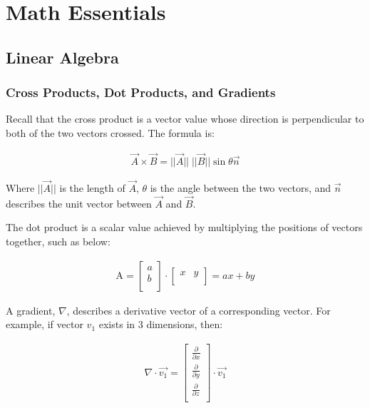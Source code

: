 \chapter{Math Essentials}

\section{Linear Algebra}

\label{sec:linalg}

\subsection{Cross Products, Dot Products, and Gradients}

Recall that the cross product is a vector value whose direction is perpendicular to both of the two vectors crossed. The formula is:

\begin{equation} \label{crossproductformula}
\begin{split}
\vec{A} \times \vec{B} = ||\vec{A}|| \; ||\vec{B}|| \sin\theta \vec{n}
\end{split}
\end{equation}

Where $||\vec{A}||$ is the length of $\vec{A}$, $\theta$ is the angle between the two vectors, and $\vec{n}$ describes the unit vector between $\vec{A}$ and $\vec{B}$.\newline

The dot product is a scalar value achieved by multiplying the positions of vectors together, such as below: 

\begin{align}
\mathrm{A} =
\begin{bmatrix} %
 a  \\ 
 b  \\ 
\end{bmatrix}
\cdot
\begin{bmatrix} %
x  &  y    \\ 
\end{bmatrix}
= 
ax + by 
\end{align}

A gradient, $\nabla$, describes a derivative vector of a corresponding vector. For example, if vector $v_1$ exists in 3 dimensions, then: 


\begin{align}
\nabla \cdot \vec{v_1} = 
\begin{bmatrix} %
\frac{\partial}{\partial x}  \\ 
\frac{\partial}{\partial y}  \\ 
\frac{\partial}{\partial z}  \\
\end{bmatrix}
\cdot
\vec{v_1}
\end{align}


